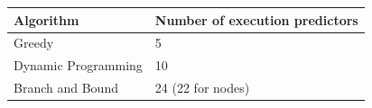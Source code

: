 \begin{tabular}{ll}
\toprule
\textbf{Algorithm} & \textbf{Number of execution predictors} \\
\midrule
Greedy & 5 \\
Dynamic Programming & 10 \\
Branch and Bound & 24 (22 for nodes) \\
\bottomrule
\end{tabular}
